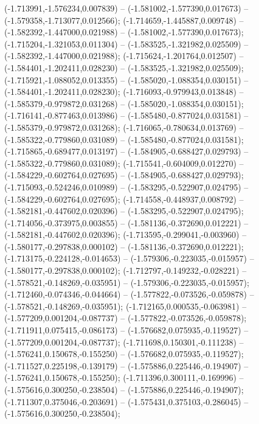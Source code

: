  (-1.713991,-1.576234,0.007839) -- (-1.581002,-1.577390,0.017673) -- (-1.579358,-1.713077,0.012566);
 (-1.714659,-1.445887,0.009748) -- (-1.582392,-1.447000,0.021988) -- (-1.581002,-1.577390,0.017673);
 (-1.715204,-1.321053,0.011304) -- (-1.583525,-1.321982,0.025509) -- (-1.582392,-1.447000,0.021988);
 (-1.715624,-1.201764,0.012507) -- (-1.584401,-1.202411,0.028230) -- (-1.583525,-1.321982,0.025509);
 (-1.715921,-1.088052,0.013355) -- (-1.585020,-1.088354,0.030151) -- (-1.584401,-1.202411,0.028230);
 (-1.716093,-0.979943,0.013848) -- (-1.585379,-0.979872,0.031268) -- (-1.585020,-1.088354,0.030151);
 (-1.716141,-0.877463,0.013986) -- (-1.585480,-0.877024,0.031581) -- (-1.585379,-0.979872,0.031268);
 (-1.716065,-0.780634,0.013769) -- (-1.585322,-0.779860,0.031089) -- (-1.585480,-0.877024,0.031581);
 (-1.715865,-0.689477,0.013197) -- (-1.584905,-0.688427,0.029793) -- (-1.585322,-0.779860,0.031089);
 (-1.715541,-0.604009,0.012270) -- (-1.584229,-0.602764,0.027695) -- (-1.584905,-0.688427,0.029793);
 (-1.715093,-0.524246,0.010989) -- (-1.583295,-0.522907,0.024795) -- (-1.584229,-0.602764,0.027695);
 (-1.714558,-0.448937,0.008792) -- (-1.582181,-0.447602,0.020396) -- (-1.583295,-0.522907,0.024795);
 (-1.714056,-0.373975,0.003855) -- (-1.581136,-0.372690,0.012221) -- (-1.582181,-0.447602,0.020396);
 (-1.713595,-0.299041,-0.003960) -- (-1.580177,-0.297838,0.000102) -- (-1.581136,-0.372690,0.012221);
 (-1.713175,-0.224128,-0.014653) -- (-1.579306,-0.223035,-0.015957) -- (-1.580177,-0.297838,0.000102);
 (-1.712797,-0.149232,-0.028221) -- (-1.578521,-0.148269,-0.035951) -- (-1.579306,-0.223035,-0.015957);
 (-1.712460,-0.074346,-0.044664) -- (-1.577822,-0.073526,-0.059878) -- (-1.578521,-0.148269,-0.035951);
 (-1.712165,0.000535,-0.063981) -- (-1.577209,0.001204,-0.087737) -- (-1.577822,-0.073526,-0.059878);
 (-1.711911,0.075415,-0.086173) -- (-1.576682,0.075935,-0.119527) -- (-1.577209,0.001204,-0.087737);
 (-1.711698,0.150301,-0.111238) -- (-1.576241,0.150678,-0.155250) -- (-1.576682,0.075935,-0.119527);
 (-1.711527,0.225198,-0.139179) -- (-1.575886,0.225446,-0.194907) -- (-1.576241,0.150678,-0.155250);
 (-1.711396,0.300111,-0.169996) -- (-1.575616,0.300250,-0.238504) -- (-1.575886,0.225446,-0.194907);
 (-1.711307,0.375046,-0.203691) -- (-1.575431,0.375103,-0.286045) -- (-1.575616,0.300250,-0.238504);
